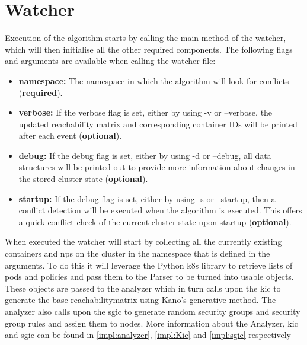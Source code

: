 \section{Watcher} \label{impl:watcher} Execution of the algorithm starts by calling the main method of the watcher, which will then initialise all the other required components. The following flags and arguments are available when calling the watcher file:
\begin{itemize}
    \renewcommand{\labelitemi}{\scriptsize$\blacksquare$}
    \item \textbf{namespace:} The namespace in which the algorithm will look for conflicts (\textbf{required}).
    \item \textbf{verbose:} If the verbose flag is set, either by using -v or --verbose, the updated reachability matrix and corresponding container IDs will be printed after each event (\textbf{optional}). 
    \item \textbf{debug:} If the debug flag is set, either by using -d or --debug, all data structures will be printed out to provide more information about changes in the stored cluster state (\textbf{optional}).
    \item \textbf{startup:} If the debug flag is set, either by using -s or --startup, then a conflict detection will be executed when the algorithm is executed. This offers a quick conflict check of the current cluster state upon startup (\textbf{optional}).
\end{itemize}
When executed the watcher will start by collecting all the currently existing containers and \acrshort{np}s on the cluster in the namespace that is defined in the arguments. To do this it will leverage the Python \acrshort{k8s} library to retrieve lists of pods and policies and pass them to the Parser to be turned into usable objects. These objects are passed to the analyzer which in turn calls upon the \acrlong{kic} to generate the base reachabilitymatrix using Kano's generative method. The analyzer also calls upon the \acrlong{sgic} to generate random security groups and security group rules and assign them to nodes. More information about the Analyzer, \acrshort{kic} and \acrshort{sgic} can be found in \autoref{impl:analyzer}, \autoref{impl:Kic} and \autoref{impl:sgic} respectively
\\[10pt]

